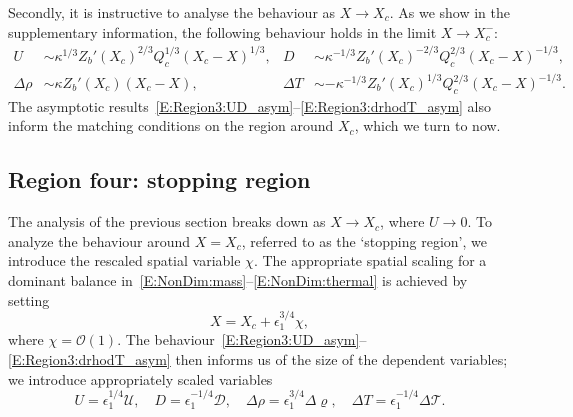 \documentclass[openacc]{rsproca_new}%
\newcommand{\order}[1]{\mathcal{O}(#1)}
\newcommand{\epsone}{\epsilon_{1}} %
\begin{document}
Secondly, it is instructive to analyse the behaviour as $X \to X_c$. As we show in the supplementary information, the following behaviour holds in the limit $X \to X_c^-$:
\begin{align}
U &\sim \kappa^{1/3} Z_b'(X_c)^{2/3} Q_c^{1/3}(X_c - X)^{1/3}, & 
D &\sim \kappa^{-1/3} Z_b'(X_c)^{-2/3} Q_c^{2/3}(X_c - X)^{-1/3}, \label{E:Region3:UD_asym} \\
\Delta \rho &\sim  \kappa Z_b'(X_c) (X_c - X), &
 \Delta T &\sim -\kappa^{-1/3} Z_b'(X_c)^{1/3} Q_c^{2/3}(X_c - X)^{-1/3}.\label{E:Region3:drhodT_asym}
 \end{align}
The asymptotic results~\eqref{E:Region3:UD_asym}--\eqref{E:Region3:drhodT_asym} also inform the matching conditions on the region around $X_c$, which we turn to now.




\subsection{Region four: stopping region}\label{S:Asymptotics:Region4}
\newcommand{\U}{\mathcal{U}}
\newcommand{\D}{\mathcal{D}}
\newcommand{\p}{\Delta \varrho}
\renewcommand{\t}{\Delta \mathcal{T}}

The analysis of the previous section breaks down as $X \to X_c$, where $U \to 0$. To analyze the behaviour around $X = X_c$, referred to as the `stopping region', we introduce the rescaled spatial variable $\chi$. The appropriate spatial scaling for a dominant balance in~\eqref{E:NonDim:mass}--\eqref{E:NonDim:thermal} is achieved by setting 
\begin{equation}\label{E:Region4:X_scaling}
X = X_c + \epsone^{3/4}\chi,
\end{equation}
where $\chi = \order{1}$. The behaviour~\eqref{E:Region3:UD_asym}--\eqref{E:Region3:drhodT_asym} then informs us of the size of the dependent variables; we introduce appropriately scaled variables
\begin{equation}\label{E:Region4:var_scaling}
U = \epsone^{1/4}\U, \quad D = \epsone^{-1/4}\D, \quad \Delta \rho = \epsone^{3/4}\p, \quad  \Delta T = \epsone^{-1/4} \t.
\end{equation}
\end{document}
